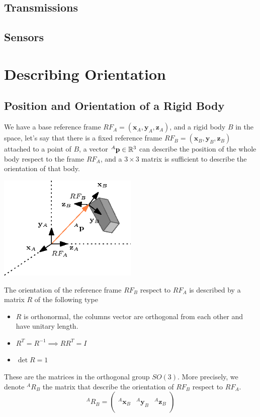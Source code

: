 \documentclass[10pt, letterpaper]{report}
\begin{document}
\section{Transmissions}
\section{Sensors}
\chapter{Describing Orientation}
\section{Position and Orientation of a Rigid Body}
We have a base reference frame $RF_A=(\mathbf x_A,\mathbf y_A,\mathbf z_A)$, and a rigid body $B$ in the space, let's say that there is a fixed reference frame $RF_B=(\mathbf x_B,\mathbf y_B,\mathbf z_B)$ attached to a point of $B$, a vector ${}^A\mathbf p\in{\mathbb R}^3$ can describe the position of the whole body respect to the frame $RF_A$, and a $3\times3$ matrix is sufficient to describe the orientation of that body.
\begin{center}
    \includegraphics[width=0.5\textwidth ]{images/rigid_body_pose.eps}
\end{center}
The orientation of the reference frame $RF_B$ respect to $RF_A$ is described by a matrix $R$ of the following type\begin{itemize}
    \item $R$ is orthonormal, the columns vector are orthogonal from each other and have unitary length. 
    \item $R^T=R^{-1}\implies RR^T=I$
    \item $\det R=1$
\end{itemize}
These are the matrices in the orthogonal group $SO(3)$. More precisely, we denote ${}^AR_B$ the matrix that describe the orientation of $RF_B$ respect to $RF_A$. \begin{equation}
    {}^AR_B=\begin{pmatrix}
        &&\\
        {}^A\mathbf x_B&{}^A\mathbf y_B&{}^A\mathbf z_B\\
        &&
    \end{pmatrix}
\end{equation}
\end{document}
